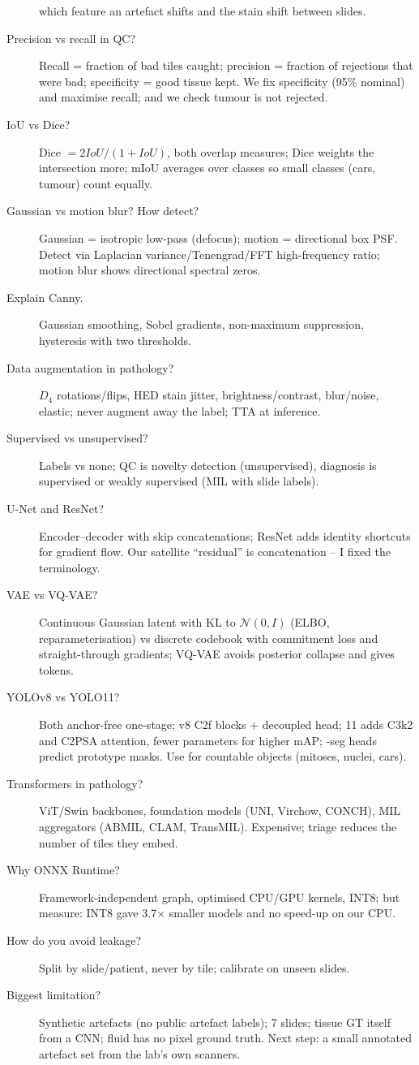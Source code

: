\begin{description}
which feature an artefact shifts and the stain shift between slides.
\item[Precision vs recall in QC?] Recall = fraction of bad tiles caught; precision = fraction of rejections that were bad;
specificity = good tissue kept. We fix specificity (95\% nominal) and maximise recall; and we check tumour is not rejected.
\item[IoU vs Dice?] Dice $=2IoU/(1+IoU)$, both overlap measures; Dice weights the intersection more; mIoU averages over
classes so small classes (cars, tumour) count equally.
\item[Gaussian vs motion blur? How detect?] Gaussian = isotropic low-pass (defocus); motion = directional box PSF.
Detect via Laplacian variance/Tenengrad/FFT high-frequency ratio; motion blur shows directional spectral zeros.
\item[Explain Canny.] Gaussian smoothing, Sobel gradients, non-maximum suppression, hysteresis with two thresholds.
\item[Data augmentation in pathology?] $D_4$ rotations/flips, HED stain jitter, brightness/contrast, blur/noise, elastic;
never augment away the label; TTA at inference.
\item[Supervised vs unsupervised?] Labels vs none; QC is novelty detection (unsupervised), diagnosis is supervised or weakly
supervised (MIL with slide labels).
\item[U-Net and ResNet?] Encoder--decoder with skip concatenations; ResNet adds identity shortcuts for gradient flow. Our
satellite ``residual'' is concatenation -- I fixed the terminology.
\item[VAE vs VQ-VAE?] Continuous Gaussian latent with KL to $\mathcal{N}(0,I)$ (ELBO, reparameterisation) vs discrete codebook
with commitment loss and straight-through gradients; VQ-VAE avoids posterior collapse and gives tokens.
\item[YOLOv8 vs YOLO11?] Both anchor-free one-stage; v8 C2f blocks + decoupled head; 11 adds C3k2 and C2PSA attention,
fewer parameters for higher mAP; -seg heads predict prototype masks. Use for countable objects (mitoses, nuclei, cars).
\item[Transformers in pathology?] ViT/Swin backbones, foundation models (UNI, Virchow, CONCH), MIL aggregators
(ABMIL, CLAM, TransMIL). Expensive; triage reduces the number of tiles they embed.
\item[Why ONNX Runtime?] Framework-independent graph, optimised CPU/GPU kernels, INT8; but measure: INT8 gave 3.7$\times$
smaller models and no speed-up on our CPU.
\item[How do you avoid leakage?] Split by slide/patient, never by tile; calibrate on unseen slides.
\item[Biggest limitation?] Synthetic artefacts (no public artefact labels); 7 slides; tissue GT itself from a CNN; fluid has
no pixel ground truth. Next step: a small annotated artefact set from the lab's own scanners.
\end{description}

